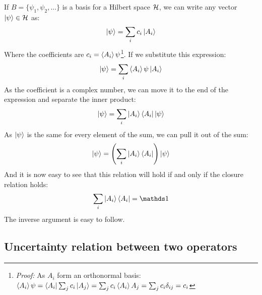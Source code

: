 If $B = \{\psi_1, \psi_2, ...\}$ is a basis for a Hilbert space $\mathcal{H}$, we can write any vector $\ket{\psi}\in\mathcal{H}$ as:
\begin{equation}
    \ket{\psi} = \sum_i c_i\ket{A_i}
\end{equation}
Where the coefficients are $c_i = \braket{A_i}{\psi}$\footnote{\textit{Proof:} As $A_i$ form an orthonormal basis: $\braket{A_i}{\psi} = \bra{A_i}\sum_jc_i\ket{A_j} = \sum_jc_i\braket{A_i}{A_j} = \sum_jc_i\delta_{ij} = c_i$}. If we substitute this expression:
\begin{equation}
    \ket{\psi} = \sum_i \braket{A_i}{\psi}\ket{A_i}
\end{equation}
As the coefficient is a complex number, we can move it to the end of the expression and separate the inner product:
\begin{equation}
    \ket{\psi} = \sum_i \ket{A_i}\bra{A_i}\ket{\psi}
\end{equation}
As $\ket{\psi}$ is the same for every element of the sum, we can pull it out of the sum:
\begin{equation}
    \ket{\psi} = \left(\sum_i \ket{A_i}\bra{A_i}\right)\ket{\psi}
\end{equation}
And it is now easy to see that this relation will hold if and only if the closure relation holds:
\begin{equation}
    \sum_i \ket{A_i}\bra{A_i} = \Imat
\end{equation}
The inverse argument is easy to follow.

\subsection{Uncertainty relation between two operators} \label{uncertainty_relation}

